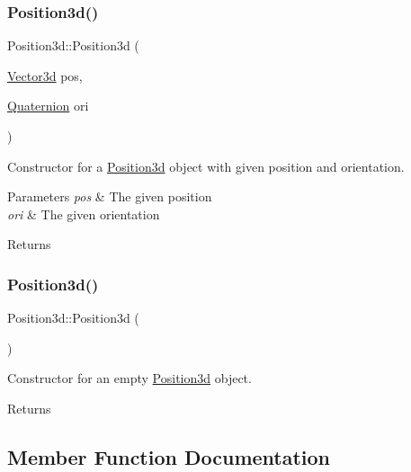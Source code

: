 \subsubsection{\texorpdfstring{Position3d()}{Position3d()}\hspace{0.1cm}{\footnotesize\ttfamily [2/3]}}
{\footnotesize\ttfamily Position3d\+::\+Position3d (\begin{DoxyParamCaption}\item[{\hyperlink{structVector3d}{Vector3d}}]{pos,  }\item[{\hyperlink{structQuaternion}{Quaternion}}]{ori }\end{DoxyParamCaption})}



Constructor for a \hyperlink{classPosition3d}{Position3d} object with given position and orientation. 


\begin{DoxyParams}{Parameters}
{\em pos} & The given position \\
\hline
{\em ori} & The given orientation\\
\hline
\end{DoxyParams}
\begin{DoxyReturn}{Returns}

\end{DoxyReturn}
\mbox{\label{classPosition3d_a0295a79fb99a32b699f366f5f2e5a331}} 
\subsubsection{\texorpdfstring{Position3d()}{Position3d()}\hspace{0.1cm}{\footnotesize\ttfamily [3/3]}}
{\footnotesize\ttfamily Position3d\+::\+Position3d (\begin{DoxyParamCaption}{ }\end{DoxyParamCaption})\hspace{0.3cm}{\ttfamily [inline]}}



Constructor for an empty \hyperlink{classPosition3d}{Position3d} object. 

\begin{DoxyReturn}{Returns}

\end{DoxyReturn}


\subsection{Member Function Documentation}
\mbox{\label{classPosition3d_a57d5c31102109a08d42d2046074e6223}} 
